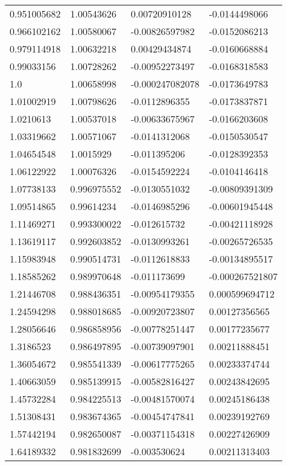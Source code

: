 \begin{longtable}{llll}
	0.951005682 & 1.00543626 & 0.00720910128 & -0.0144498066 \\ 
	0.966102162 & 1.00580067 & -0.00826597982 & -0.0152086213 \\ 
	0.979114918 & 1.00632218 & 0.00429434874 & -0.0160668884 \\ 
	0.99033156 & 1.00728262 & -0.00952273497 & -0.0168318583 \\ 
	1.0 & 1.00658998 & -0.000247082078 & -0.0173649783 \\ 
	1.01002919 & 1.00798626 & -0.0112896355 & -0.0173837871 \\ 
	1.0210613 & 1.00537018 & -0.00633675967 & -0.0166203608 \\ 
	1.03319662 & 1.00571067 & -0.0141312068 & -0.0150530547 \\ 
	1.04654548 & 1.0015929 & -0.011395206 & -0.0128392353 \\ 
	1.06122922 & 1.00076326 & -0.0154592224 & -0.0104146418 \\ 
	1.07738133 & 0.996975552 & -0.0130551032 & -0.00809391309 \\ 
	1.09514865 & 0.99614234 & -0.0146985296 & -0.00601945448 \\ 
	1.11469271 & 0.993300022 & -0.012615732 & -0.00421118928 \\ 
	1.13619117 & 0.992603852 & -0.0130993261 & -0.00265726535 \\ 
	1.15983948 & 0.990514731 & -0.0112618833 & -0.00134895517 \\ 
	1.18585262 & 0.989970648 & -0.011173699 & -0.000267521807 \\ 
	1.21446708 & 0.988436351 & -0.00954179355 & 0.000599694712 \\ 
	1.24594298 & 0.988018685 & -0.00920723807 & 0.00127356565 \\ 
	1.28056646 & 0.986858956 & -0.00778251447 & 0.00177235677 \\ 
	1.3186523 & 0.986497895 & -0.00739097901 & 0.00211888451 \\ 
	1.36054672 & 0.985541339 & -0.00617775265 & 0.00233374744 \\ 
	1.40663059 & 0.985139915 & -0.00582816427 & 0.00243842695 \\ 
	1.45732284 & 0.984225513 & -0.00481570074 & 0.00245186438 \\ 
	1.51308431 & 0.983674365 & -0.00454747841 & 0.00239192769 \\ 
	1.57442194 & 0.982650087 & -0.00371154318 & 0.00227426909 \\ 
	1.64189332 & 0.981832699 & -0.003530624 & 0.00211313403 \\ 

\end{longtable}

